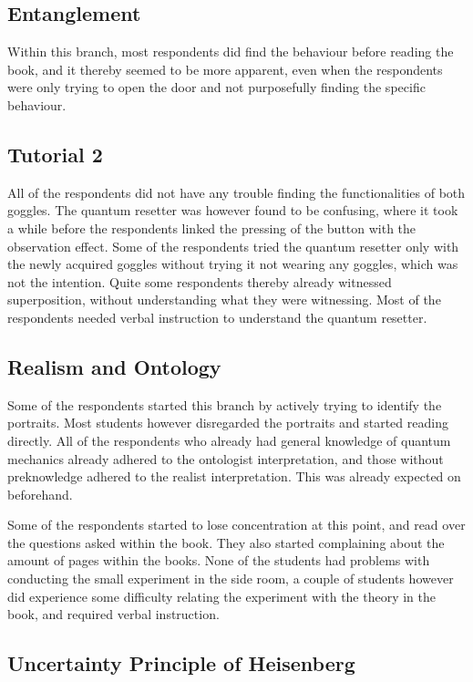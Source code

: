 \documentclass[11pt,twoside]{report} %
\begin{document}
\subsection{Entanglement}

Within this branch, most respondents did find the behaviour before reading the book, and it thereby seemed to be more apparent, even when the respondents were only trying to open the door and not purposefully finding the specific behaviour.

\subsection{Tutorial 2}

All of the respondents did not have any trouble finding the functionalities of both goggles. The quantum resetter was however found to be confusing, where it took a while before the respondents linked the pressing of the button with the observation effect. Some of the respondents tried the quantum resetter only with the newly acquired goggles without trying it not wearing any goggles, which was not the intention. Quite some respondents thereby already witnessed superposition, without understanding what they were witnessing. Most of the respondents needed verbal instruction to understand the quantum resetter.

\subsection{Realism and Ontology}

Some of the respondents started this branch by actively trying to identify the portraits. Most students however disregarded the portraits and started reading directly. All of the respondents who already had general knowledge of quantum mechanics already adhered to the ontologist interpretation, and those without preknowledge adhered to the realist interpretation. This was already expected on beforehand.

Some of the respondents started to lose concentration at this point, and read over the questions asked within the book. They also started complaining about the amount of pages within the books. None of the students had problems with conducting the small experiment in the side room, a couple of students however did experience some difficulty relating the experiment with the theory in the book, and required verbal instruction.

\subsection{Uncertainty Principle of Heisenberg}
\end{document}

